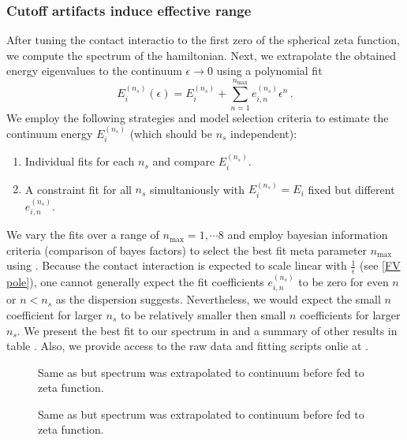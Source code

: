 \subsubsection{Cutoff artifacts induce effective range}

After tuning the contact interactio to the first zero of the spherical zeta function, we compute the spectrum of the hamiltonian.
Next, we extrapolate the obtained energy eigenvalues to the continuum $\epsilon \to 0$ using a polynomial fit
\begin{equation}
    E^{(n_s)}_i(\epsilon) = E_i^{(n_s)} + \sum\limits_{n=1}^{n_\mathrm{max}} e_{i,n}^{(n_s)} \epsilon^n \, .
\end{equation}
We employ the following strategies and model selection criteria to estimate the continuum energy $E_i^{(n_s)}$ (which should be $n_s$ independent):
\begin{enumerate}
    \item Individual fits for each $n_s$ and compare $E_i^{(n_s)}$.
    \item A constraint fit for all $n_s$ simultaniously with $E_i^{(n_s)} = E_i$ fixed but different $e_{i,n}^{(n_s)}$.
\end{enumerate}
We vary the fits over a range of $n_\mathrm{max}=1, \cdots 8$ and employ bayesian information criteria (comparison of bayes factors) to select the best fit meta parameter $n_\mathrm{max}$ using \cite{peter_lepage_2016_60221}.
Because the contact interaction is expected to scale linear with $\frac{1}{\epsilon}$ (see \eqref{FV pole}), one cannot generally expect the fit coefficients $e_{i,n}^{(n_s)}$ to be zero for even $n$ or $n < n_s$ as the dispersion suggests.
Nevertheless, we would expect the small $n$ coefficient for larger $n_s$ to be relatively smaller then small $n$ coefficients for larger $n_s$.
We present the best fit to our spectrum in  and a summary of other results in table .
Also, we provide access to the raw data and fitting scripts onlie at \cite{repo}.


\begin{figure}[th]
    \scalebox{0.9}{}
    \caption{Same as  but spectrum was extrapolated to continuum before fed to zeta function.}
    \label{fig:unimproved spherical continuum extrapolation}
\end{figure}

\begin{figure}[th]
    \scalebox{0.9}{}
    \caption{Same as  but spectrum was extrapolated to continuum before fed to zeta function.}
    \label{fig:unimproved spherical continuum extrapolation}
\end{figure}


